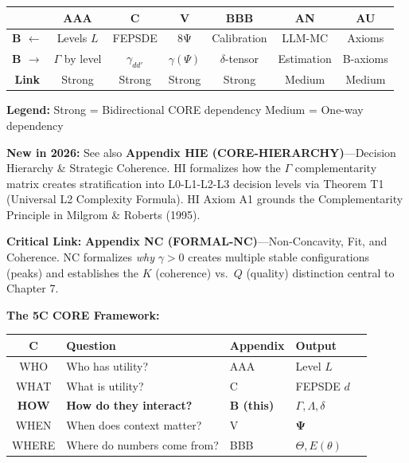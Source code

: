 \begin{tcolorbox}[colback=white, colframe=black, 
    title=\textbf{Cross-Reference Map}]

\begin{center}
\small
\begin{tabular}{@{}c|cccccc@{}}
\toprule
& \textbf{AAA} & \textbf{C} & \textbf{V} & \textbf{BBB} & \textbf{AN} & \textbf{AU} \\
\midrule
\textbf{B $\leftarrow$} & Levels $L$ & FEPSDE & 8Ψ & Calibration & LLM-MC & Axioms \\
\textbf{B $\rightarrow$} & $\Gamma$ by level & $\gamma_{dd'}$ & $\gamma(\Psi)$ & $\delta$-tensor & Estimation & B-axioms \\
\midrule
\textbf{Link} & \cellcolor{red!20}Strong & \cellcolor{red!20}Strong & \cellcolor{red!20}Strong & \cellcolor{red!20}Strong & \cellcolor{yellow!20}Medium & \cellcolor{yellow!20}Medium \\
\bottomrule
\end{tabular}
\end{center}

\textbf{Legend:}
\colorbox{red!20}{Strong} = Bidirectional CORE dependency \quad
\colorbox{yellow!20}{Medium} = One-way dependency

\textbf{New in 2026:} See also \textbf{Appendix HIE (CORE-HIERARCHY)}---Decision Hierarchy \& Strategic Coherence. HI formalizes how the $\Gamma$ complementarity matrix creates stratification into L0-L1-L2-L3 decision levels via Theorem T1 (Universal L2 Complexity Formula). HI Axiom A1 grounds the Complementarity Principle in Milgrom \& Roberts (1995).

\textbf{Critical Link:} \textbf{Appendix NC (FORMAL-NC)}---Non-Concavity, Fit, and Coherence. NC formalizes \textit{why} $\gamma > 0$ creates multiple stable configurations (peaks) and establishes the $K$ (coherence) vs.\ $Q$ (quality) distinction central to Chapter 7.

\textbf{The 5C CORE Framework:}
\begin{center}
\begin{tabular}{@{}cllll@{}}
\toprule
\textbf{C} & \textbf{Question} & \textbf{Appendix} & \textbf{Output} \\
\midrule
WHO & Who has utility? & AAA & Level $L$ \\
WHAT & What is utility? & C & FEPSDE $d$ \\
\textbf{HOW} & \textbf{How do they interact?} & \textbf{B (this)} & $\Gamma, \Lambda, \delta$ \\
WHEN & When does context matter? & V & $\boldsymbol{\Psi}$ \\
WHERE & Where do numbers come from? & BBB & $\Theta, E(\theta)$ \\
\bottomrule
\end{tabular}
\end{center}

\end{tcolorbox}

